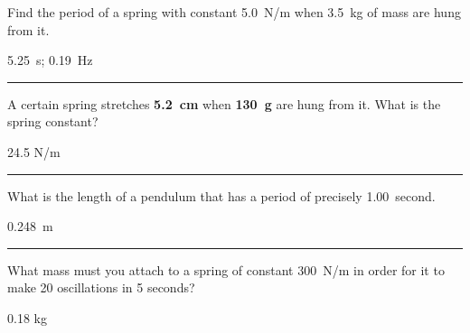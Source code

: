 \documentclass[12pt]{exam}
\begin{document}
\Large

\def\mystrut{\protect\rule[-2.2ex]{0ex}{2.2ex}} 
\qformat{ \textbf{Task \#\thequestion}
  \mystrut  \hfill}


\begin{questions}



\question
   Find the period of a spring with constant 5.0~N/m when 3.5~kg of mass are hung from it.

   \begin{solution}
    5.25~s; 0.19~Hz
  \end{solution}


\vs \hrule \vs

\question
  A certain spring stretches {\bf 5.2~cm} when {\bf 130~g} are hung from it.  What is the spring constant?

  \begin{solution}
    24.5 N/m
  \end{solution}

\vs \hrule \vs


\question
  What is the length of a pendulum that has a period of precisely 1.00~second.

   \begin{solution}
    0.248~m
  \end{solution}


\vs \hrule \vs


\question
  What mass must you attach to a spring of constant 300~N/m in order for it to make 20 oscillations in 5 seconds?

   \begin{solution}
    0.18 kg
  \end{solution}





\end{questions}
\end{document}
